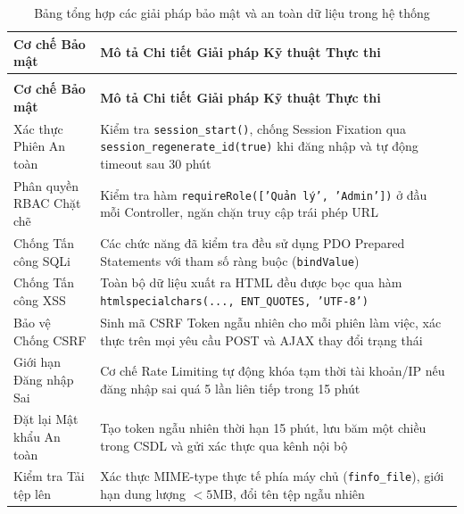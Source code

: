 \documentclass[12pt,a4paper]{report}
\begin{document}
{\fontsize{9pt}{11.5pt}\selectfont
\begin{xltabular}{\linewidth}{|>{\raggedright\arraybackslash}p{4.2cm}|>{\raggedright\arraybackslash}X|}
  \caption{Bảng tổng hợp các giải pháp bảo mật và an toàn dữ liệu trong hệ thống} \label{tab:bao_mat_summary} \\
  \hline
  \textbf{Cơ chế Bảo mật} & \textbf{Mô tả Chi tiết Giải pháp Kỹ thuật Thực thi} \\ \hline
  \endfirsthead
   \\ \hline
  \textbf{Cơ chế Bảo mật} & \textbf{Mô tả Chi tiết Giải pháp Kỹ thuật Thực thi} \\ \hline
  \endhead
  \hline
  \endfoot
  Xác thực Phiên An toàn   & Kiểm tra \texttt{session\_start()}, chống Session Fixation qua \texttt{session\_regenerate\_id(true)} khi đăng nhập và tự động timeout sau 30 phút        \\ \hline
  Phân quyền RBAC Chặt chẽ & Kiểm tra hàm \texttt{requireRole(['Quản lý', 'Admin'])} ở đầu mỗi Controller, ngăn chặn truy cập trái phép URL                                            \\ \hline
  Chống Tấn công SQLi      & Các chức năng đã kiểm tra đều sử dụng PDO Prepared Statements với tham số ràng buộc (\texttt{bindValue})                                                  \\ \hline
  Chống Tấn công XSS       & Toàn bộ dữ liệu xuất ra HTML đều được bọc qua hàm \texttt{htmlspecialchars(..., ENT\_QUOTES, 'UTF-8')}                                                    \\ \hline
  Bảo vệ Chống CSRF        & Sinh mã CSRF Token ngẫu nhiên cho mỗi phiên làm việc, xác thực trên mọi yêu cầu POST và AJAX thay đổi trạng thái                                          \\ \hline
  Giới hạn Đăng nhập Sai   & Cơ chế Rate Limiting tự động khóa tạm thời tài khoản/IP nếu đăng nhập sai quá 5 lần liên tiếp trong 15 phút                                               \\ \hline
  Đặt lại Mật khẩu An toàn & Tạo token ngẫu nhiên thời hạn 15 phút, lưu băm một chiều trong CSDL và gửi xác thực qua kênh nội bộ                                                       \\ \hline
  Kiểm tra Tải tệp lên     & Xác thực MIME-type thực tế phía máy chủ (\texttt{finfo\_file}), giới hạn dung lượng $< 5\text{MB}$, đổi tên tệp ngẫu nhiên                                \\ \hline

\end{xltabular}}
\end{document}
